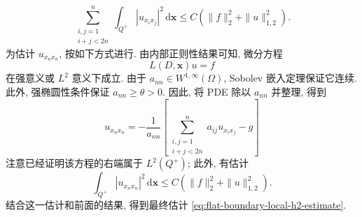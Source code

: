 \begin{Proof}
\begin{equation}\label{eq:flat-boundary-mixed-second-derivative-bound}
\sum_{\substack{i,j=1\\i+j<2n}}^n\int_{Q^+}|u_{x_ix_j}|^2\,\mathrm{d}\bm{x}\leq C(\|f\|_2^2+\|u\|_{1,2}^2).
\end{equation}
为估计 $u_{x_nx_n}$, 按如下方式进行. 由内部正则性结果可知, 微分方程\[L(D,\bm{x})u=f\]在强意义或 $L^2$ 意义下成立. 由于 $a_{nn}\in W^{1,\infty}(\Omega)$, Sobolev 嵌入定理保证它连续. 此外, 强椭圆性条件保证 $a_{nn}\geq\theta>0$. 因此, 将 PDE 除以 $a_{nn}$ 并整理, 得到
\begin{equation}\label{eq:flat-boundary-normal-second-derivative-recovery}
u_{x_nx_n}=-\frac{1}{a_{nn}}\left[\sum_{\substack{i,j=1\\i+j<2n}}^na_{ij}u_{x_ix_j}-g\right]
\end{equation}
注意已经证明该方程的右端属于 $L^2(Q^+)$; 此外, 有估计
\begin{equation}\label{eq:flat-boundary-normal-second-derivative-bound}
\int_{Q^+}|u_{x_nx_n}|^2\,\mathrm{d}\bm{x}\leq C(\|f\|_2^2+\|u\|_{1,2}^2).
\end{equation}
结合这一估计和前面的结果, 得到最终估计 \eqref{eq:flat-boundary-local-h2-estimate}.
\end{Proof}
\endgroup
\endgroup
